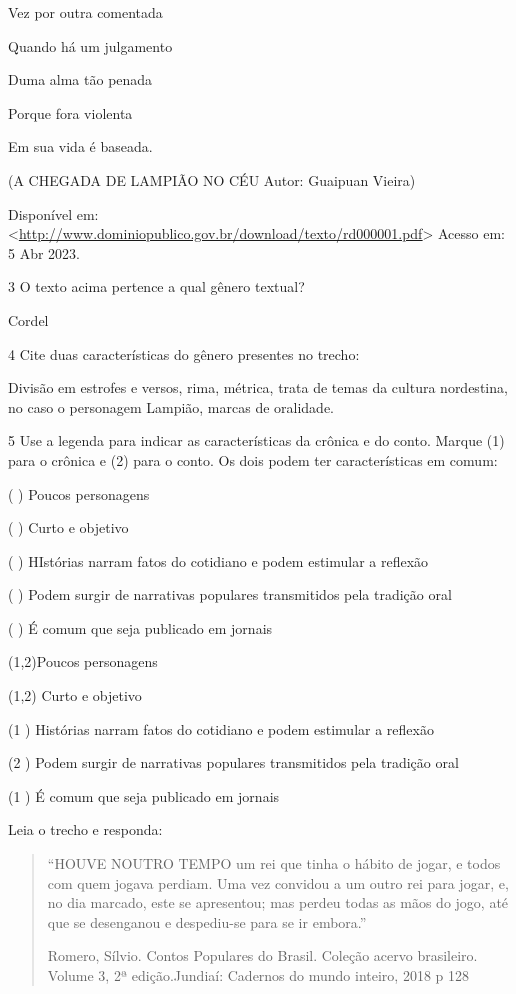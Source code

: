 {Vez por outra comentada

Quando há um julgamento

Duma alma tão penada

Porque fora violenta

Em sua vida é baseada.

(A CHEGADA DE LAMPIÃO NO CÉU Autor: Guaipuan Vieira)

Disponível em:
\textless{}\href{http://www.dominiopublico.gov.br/download/texto/rd000001.pdf}{\uline{http://www.dominiopublico.gov.br/download/texto/rd000001.pdf}}\textgreater{}
Acesso em: 5 Abr 2023.

\num{3} O texto acima pertence a qual gênero textual?

Cordel

\num{4} Cite duas características do gênero presentes no trecho:

Divisão em estrofes e versos, rima, métrica, trata de temas da cultura
nordestina, no caso o personagem Lampião, marcas de oralidade.

\num{5} Use a legenda para indicar as características da crônica e do conto.
  Marque (1) para o crônica e (2) para o conto. Os dois podem ter
  características em comum:

( ) Poucos personagens

( ) Curto e objetivo

( ) HIstórias narram fatos do cotidiano e podem estimular a reflexão

( ) Podem surgir de narrativas populares transmitidos pela tradição oral

( ) É comum que seja publicado em jornais

(1,2)Poucos personagens

(1,2) Curto e objetivo

(1 ) Histórias narram fatos do cotidiano e podem estimular a reflexão

(2 ) Podem surgir de narrativas populares transmitidos pela tradição
oral

(1 ) É comum que seja publicado em jornais


Leia o trecho e responda:

\begin{quote}
``HOUVE NOUTRO TEMPO um rei que tinha o hábito de jogar, e todos com
quem jogava perdiam. Uma vez convidou a um outro rei para jogar, e, no
dia marcado, este se apresentou; mas perdeu todas as mãos do jogo, até
que se desenganou e despediu-se para se ir embora.''

Romero, Sílvio. Contos Populares do Brasil. Coleção acervo brasileiro.
Volume 3, 2ª edição.Jundiaí: Cadernos do mundo inteiro, 2018 p 128
\end{quote}

}
